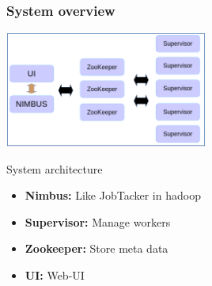 \begin{frame}
\frametitle{System overview}
\centering
\includegraphics[width=0.5\textwidth,keepaspectratio=true]{figs/12/storm}
\begin{block}{System architecture}
\begin{itemize}

\item \textbf{Nimbus:} Like JobTacker in hadoop
\item \textbf{Supervisor:} Manage workers 
\item \textbf{Zookeeper:} Store meta data 
\item \textbf{UI:} Web-UI 
\end{itemize}
\end{block}
\end{frame}

